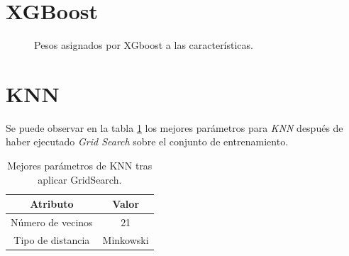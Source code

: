 \section{XGBoost}

  \begin{figure}[H]
      \centering
      
      \caption{Pesos asignados por XGboost a las características.}
      \label{FeatureWeightsImage}
   \end{figure}

\section{KNN}
  Se puede observar en la tabla \ref{BestParamsKNNGridSearchTable} los mejores parámetros para \textit{KNN} después de haber ejecutado \textit{Grid Search} sobre el conjunto de entrenamiento.\\

  \begin{table}[H]
      \centering
      \begin{tabular}{ |c|c| }
          \hline
          Atributo & Valor\\
          \hline
              Número de vecinos & 21 \\ 
              Tipo de distancia & Minkowski \\ 
          \hline
      \end{tabular}
      \caption{Mejores parámetros de KNN tras aplicar GridSearch.}
      \label{BestParamsKNNGridSearchTable}
  \end{table}


